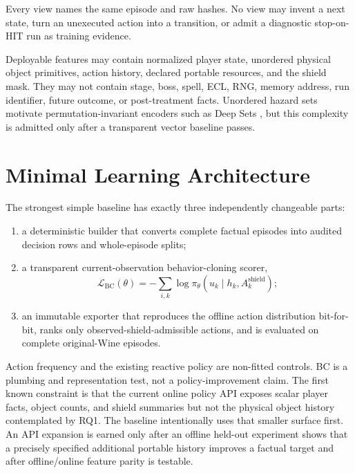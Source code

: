 \documentclass[11pt]{article}
\begin{document}
Every view names the same episode and raw hashes.  No view may invent a next
state, turn an unexecuted action into a transition, or admit a diagnostic
stop-on-HIT run as training evidence.

Deployable features may contain normalized player state, unordered physical
object primitives, action history, declared portable resources, and the shield
mask.  They may not contain stage, boss, spell, ECL, RNG, memory address, run
identifier, future outcome, or post-treatment facts.  Unordered hazard sets
motivate permutation-invariant encoders such as Deep Sets
\citep{zaheer2017deepsets}, but this complexity is admitted only after a
transparent vector baseline passes.

\section{Minimal Learning Architecture}

The strongest simple baseline has exactly three independently changeable parts:

\begin{enumerate}
  \item a deterministic builder that converts complete factual episodes into
        audited decision rows and whole-episode splits;
  \item a transparent current-observation behavior-cloning scorer,
        \begin{equation}
          \mathcal{L}_{\mathrm{BC}}(\theta)
          = -\sum_{i,k}\log \pi_\theta(u_k\mid h_k,
                                      A_k^{\mathrm{shield}});
        \end{equation}
  \item an immutable exporter that reproduces the offline action distribution
        bit-for-bit, ranks only observed-shield-admissible actions, and is
        evaluated on complete original-Wine episodes.
\end{enumerate}

Action frequency and the existing reactive policy are non-fitted controls.
BC is a plumbing and representation test, not a policy-improvement claim.  The
first known constraint is that the current online policy API exposes scalar
player facts, object counts, and shield summaries but not the physical object
history contemplated by RQ1.  The baseline intentionally uses that smaller
surface first.  An API expansion is earned only after an offline held-out
experiment shows that a precisely specified additional portable history
improves a factual target and after offline/online feature parity is testable.
\end{document}

